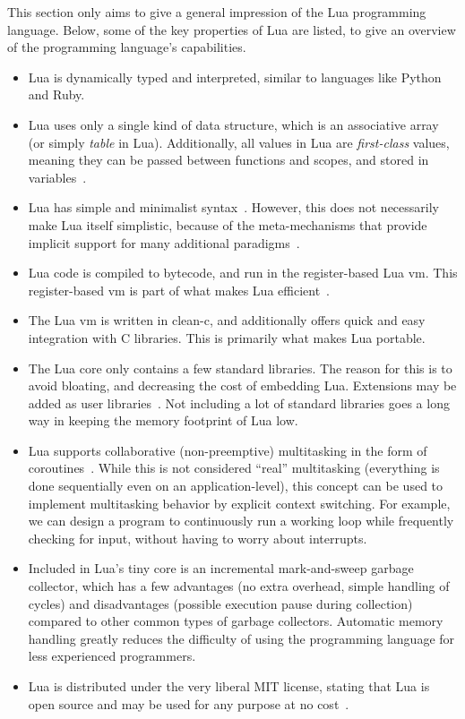 This section only aims to give a general impression of the Lua programming language.  Below, some of the key properties of Lua are listed, to give an overview of the programming language's capabilities.
\begin{itemize}
	\item Lua is dynamically typed and interpreted, similar to languages like Python and Ruby.
	\item Lua uses only a single kind of data structure, which is an associative array (or simply \emph{table} in Lua). Additionally, all values in Lua are \emph{first-class} values, meaning they can be passed between functions and scopes, and stored in variables~\cite[ch. 2.2]{manual:lua_reference_manual}.
	\item Lua has simple and minimalist syntax~\cite[ch. 9]{manual:lua_reference_manual}. However, this does not necessarily make Lua itself simplistic, because of the meta-mechanisms that provide implicit support for many additional paradigms~\cite[ch. 2.8]{manual:lua_reference_manual}.
	\item Lua code is compiled to bytecode, and run in the register-based Lua \gls{vm}. This register-based \gls{vm} is part of what makes Lua efficient~\cite{article:the_implementation_of_lua}.
	\item The Lua \gls{vm} is written in \gls{clean-c}, and additionally offers quick and easy integration with C libraries. This is primarily what makes Lua portable.
	\item The Lua core only contains a few standard libraries. The reason for this is to avoid bloating, and decreasing the cost of embedding Lua. Extensions may be added as user libraries~\cite{article:the_implementation_of_lua}. Not including a lot of standard libraries goes a long way in keeping the memory footprint of Lua low.
	\item Lua supports collaborative (non-preemptive) multitasking in the form of coroutines~\cite[ch. 2.6]{manual:lua_reference_manual}. While this is not considered ``real'' multitasking (everything is done sequentially even on an application-level), this concept can be used to implement multitasking behavior by explicit context switching. For example, we can design a program to continuously run a working loop while frequently checking for input, without having to worry about interrupts. 
	\item Included in Lua's tiny core is an incremental mark-and-sweep garbage collector, which has a few advantages (no extra overhead, simple handling of cycles) and disadvantages (possible execution pause during collection) compared to other common types of garbage collectors. Automatic memory handling greatly reduces the difficulty of using the programming language for less experienced programmers.
	\item Lua is distributed under the very liberal MIT license, stating that Lua is open source and may be used for any purpose at no cost~\cite{website:lua_license}.
\end{itemize}

